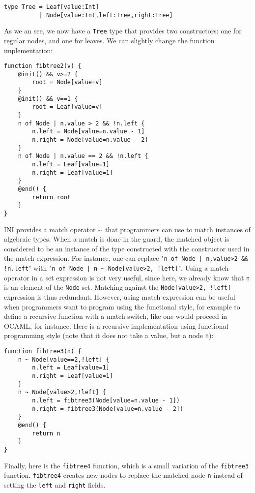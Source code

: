 \documentclass[11pt]{report}
\begin{document}
\begin{lstlisting}[numbers=none]
type Tree = Leaf[value:Int]
          | Node[value:Int,left:Tree,right:Tree]
\end{lstlisting}

As we an see, we now have a \texttt{Tree} type that provides two constructors: one for regular nodes, and one for leaves. We can slightly change the function implementation:

\begin{lstlisting}
function fibtree2(v) {
	@init() && v>=2 {
		root = Node[value=v]
	}
	@init() && v==1 {
		root = Leaf[value=v]
	}
	n of Node | n.value > 2 && !n.left {
		n.left = Node[value=n.value - 1]
		n.right = Node[value=n.value - 2]
	}
	n of Node | n.value == 2 && !n.left {
		n.left = Leaf[value=1]
		n.right = Leaf[value=1]
	}
	@end() {
		return root
	}
}
\end{lstlisting}

INI provides a match operator \~~that programmers can use to match instances of algebraic types. When a match is done in the guard, the matched object is considered to be an instance of the type constructed with the constructor used in the match expression. For instance, one can replace "\texttt{n of Node | n.value>2 \&\& !n.left}" with "\texttt{n of Node | n \~~Node[value>2, !left]}". Using a match operator in a set expression is not very useful, since here, we already know that \texttt{n} is an element of the \texttt{Node} set. Matching against the \texttt{Node[value>2, !left]} expression is thus redundant. However, using match expression can be useful when programmers want to program using the functional style, for example to define a recursive function with a match switch, like one would proceed in OCAML, for instance. Here is a recursive implementation using functional programming style (note that it does not take a value, but a node \texttt{n}):

\begin{lstlisting}
function fibtree3(n) {
	n ~ Node[value==2,!left] {
		n.left = Leaf[value=1]
		n.right = Leaf[value=1]
	}
	n ~ Node[value>2,!left] {
		n.left = fibtree3(Node[value=n.value - 1])
		n.right = fibtree3(Node[value=n.value - 2])
	}
	@end() {
		return n
	}
}
\end{lstlisting}

Finally, here is the \texttt{fibtree4} function, which is a small variation of the \texttt{fibtree3} function. \texttt{fibtree4} creates new nodes to replace the matched node \texttt{n} instead of setting the \texttt{left} and \texttt{right} fields.
\end{document}
